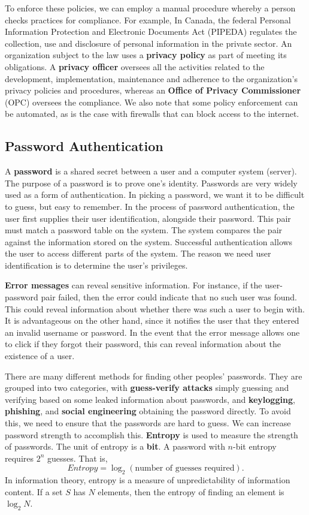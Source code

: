 \documentclass[11pt]{article}
\theoremstyle{plain} %
\theoremstyle{definition}
\theoremstyle{example}
\theoremstyle{remark}
\begin{document}
To enforce these policies, we can employ a manual procedure whereby a person checks practices for compliance. For example, In Canada, the federal Personal Information Protection and Electronic Documents Act (PIPEDA) regulates the collection, use and disclosure of personal information in the private sector. An organization subject to the law uses a \textbf{privacy policy} as part of meeting its obligations. A \textbf{privacy officer} oversees all the activities related to the development, implementation, maintenance and adherence to the organization's privacy policies and procedures, whereas an \textbf{
Office of Privacy Commissioner} (OPC) oversees the compliance. We also note that some policy enforcement can be automated, as is the case with firewalls that can block access to the internet. 

\subsection{Password Authentication}

A \textbf{password} is a shared secret between a user and a computer system (server). The purpose of a password is to prove one's identity. Passwords are very widely used as a form of authentication. In picking a password, we want it to be difficult to guess, but easy to remember. In the process of password authentication, the user first supplies their user identification, alongside their password. This pair must match a password table on the system. The system compares the pair against the information stored on the system. Successful authentication allows the user to access different parts of the system. The reason we need user identification is to determine the user's privileges. 

\textbf{Error messages} can reveal sensitive information. For instance, if the user-password pair failed, then the error could indicate that no such user was found. This could reveal information about whether there was such a user to begin with. It is advantageous on the other hand, since it notifies the user that they entered an invalid username or password. In the event that the error message allows one to click if they forgot their password, this can reveal information about the existence of a user. 

There are many different methods for finding other peoples' passwords. They are grouped into two categories, with \textbf{guess-verify attacks} simply guessing and verifying based on some leaked information about passwords, and \textbf{keylogging}, \textbf{phishing}, and \textbf{social engineering} obtaining the password directly. To avoid this, we need to ensure that the passwords are hard to guess. We can increase password strength to accomplish this. 
\textbf{Entropy} is used to measure the strength of passwords. The unit of entropy is a \textbf{bit}. A password with $n$-bit entropy requires $2^n$ guesses. That is, 
$$Entropy = \log_2(\text{number of guesses required}).$$
In information theory, entropy is a measure of unpredictability of information content. If a set $S$ has $N$ elements, then the entropy of finding an element is $\log_2N$.
\end{document}
